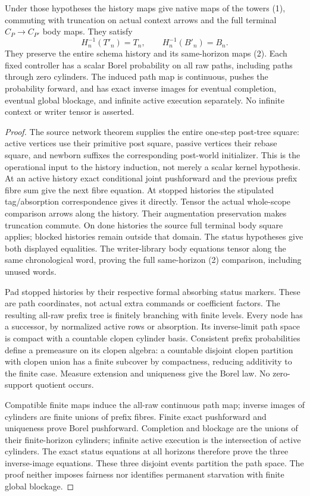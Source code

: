 \documentclass[11pt]{article}
\begin{document}
\begin{theorem}
Under those hypotheses the history maps give native maps of the towers (1),
commuting with truncation on actual context arrows and the full terminal
$C_P\to C_{P'}$ body maps. They satisfy
\[
 H_n^{-1}(T'_n)=T_n,\qquad H_n^{-1}(B'_n)=B_n.
\]
They preserve the entire schema history and its same-horizon maps (2).
Each fixed controller has a scalar Borel probability on all raw paths,
including paths through zero cylinders. The induced path map is continuous,
pushes the probability forward, and has exact inverse images for eventual
completion, eventual global blockage, and infinite active execution separately.
No infinite context or writer tensor is asserted.
\end{theorem}
\begin{proof}
The source network theorem supplies the entire one-step post-tree square:
active vertices use their primitive post square, passive vertices their
rebase square, and newborn suffixes the corresponding post-world initializer.
This is the operational input to the history induction, not merely a scalar
kernel hypothesis. At an active history exact conditional joint pushforward
and the previous prefix fibre sum give the next fibre equation. At stopped
histories the stipulated tag/absorption correspondence gives it directly.
Tensor the actual whole-scope comparison arrows along the history. Their
augmentation preservation makes truncation commute. On done histories the
source full terminal body square applies; blocked histories remain outside
that domain. The status hypotheses give both displayed equalities.
The writer-library body equations tensor along the same chronological word,
proving the full same-horizon (2) comparison, including unused words.

Pad stopped histories by their respective formal absorbing status markers.
These are path coordinates, not actual extra commands or coefficient factors.
The resulting all-raw prefix tree is finitely branching with finite levels.
Every node has a successor, by normalized active rows or absorption. Its
inverse-limit path space is compact with a countable clopen cylinder basis.
Consistent prefix probabilities define a premeasure on its clopen algebra:
a countable disjoint clopen partition with clopen union has a finite subcover
by compactness, reducing additivity to the finite case. Measure extension
and uniqueness give the Borel law. No zero-support quotient occurs.

Compatible finite maps induce the all-raw continuous path map; inverse
images of cylinders are finite unions of prefix fibres. Finite exact
pushforward and uniqueness prove Borel pushforward. Completion and blockage
are the unions of their finite-horizon cylinders; infinite active execution
is the intersection of active cylinders. The exact status equations at
all horizons therefore prove the three inverse-image equations. These
three disjoint events partition the path space. The proof neither imposes
fairness nor identifies permanent starvation with finite global blockage.
\end{proof}
\end{document}

